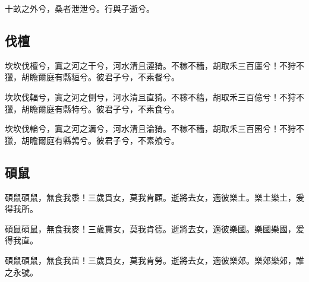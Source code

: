 十畝之外兮，桑者泄泄兮。行與子逝兮。

\subsection[伐檀]{伐檀}

坎坎伐檀兮，寘之河之干兮，河水清且漣猗。不稼不穡，胡取禾三百廛兮！不狩不獵，胡瞻爾庭有縣貆兮。彼君子兮，不素餐兮。

坎坎伐輻兮，寘之河之側兮，河水清且直猗。不稼不穡，胡取禾三百億兮！不狩不獵，胡瞻爾庭有縣特兮。彼君子兮，不素食兮。

坎坎伐輪兮，寘之河之漘兮，河水清且淪猗。不稼不穡，胡取禾三百囷兮！不狩不獵，胡瞻爾庭有縣鶉兮。彼君子兮，不素飧兮。

\subsection[碩鼠]{碩鼠}

碩鼠碩鼠，無食我黍！三歲貫女，莫我肯顧。逝將去女，適彼樂土。樂土樂土，爰得我所。

碩鼠碩鼠，無食我麥！三歲貫女，莫我肯德。逝將去女，適彼樂國。樂國樂國，爰得我直。

碩鼠碩鼠，無食我苗！三歲貫女，莫我肯勞。逝將去女，適彼樂郊。樂郊樂郊，誰之永號。
